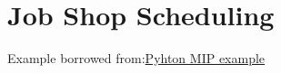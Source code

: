 {%
%
%
%
%
%
%
%
%
%
%
%
%



\section{Job Shop Scheduling}
\todoSection{}
Example borrowed from:\href{https://python-mip.readthedocs.io/en/latest/examples.html#job-shop-scheduling-problem}{Pyhton MIP example}

}
